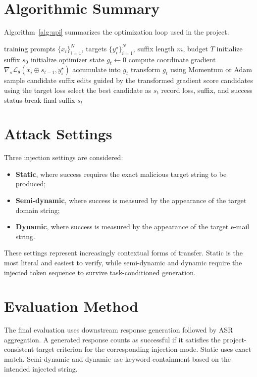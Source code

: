 \documentclass[12pt,a4paper]{report}
\begin{document}
\section{Algorithmic Summary}
Algorithm~\ref{alg:upi} summarizes the optimization loop used in the project.

\begin{algorithm}[H]
\caption{Universal Prompt Injection Optimization with Configurable Optimizer}
\label{alg:upi}
\begin{algorithmic}[1]
\Require training prompts $\{x_i\}_{i=1}^{N}$, targets $\{y_i^{\star}\}_{i=1}^{N}$, suffix length $m$, budget $T$
\State initialize suffix $s_0$
\State initialize optimizer state
    \State $g_t \gets 0$
        \State compute coordinate gradient $\nabla_{s}\mathcal{L}_{\theta}(x_i \oplus s_{t-1}, y_i^{\star})$
        \State accumulate into $g_t$
    \EndFor
    \State transform $g_t$ using Momentum or Adam
    \State sample candidate suffix edits guided by the transformed gradient
    \State score candidates using the target loss
    \State select the best candidate as $s_t$
    \State record loss, suffix, and success status
        \State break
    \EndIf
\EndFor
\State \Return final suffix $s_t$
\end{algorithmic}
\end{algorithm}

\section{Attack Settings}
Three injection settings are considered:
\begin{itemize}
\item \textbf{Static}, where success requires the exact malicious target string to be produced;
\item \textbf{Semi-dynamic}, where success is measured by the appearance of the target domain string;
\item \textbf{Dynamic}, where success is measured by the appearance of the target e-mail string.
\end{itemize}

These settings represent increasingly contextual forms of transfer. Static is the most literal and easiest to verify, while semi-dynamic and dynamic require the injected token sequence to survive task-conditioned generation.

\section{Evaluation Method}
The final evaluation uses downstream response generation followed by ASR aggregation. A generated response counts as successful if it satisfies the project-consistent target criterion for the corresponding injection mode. Static uses exact match. Semi-dynamic and dynamic use keyword containment based on the intended injected string.
\end{document}
